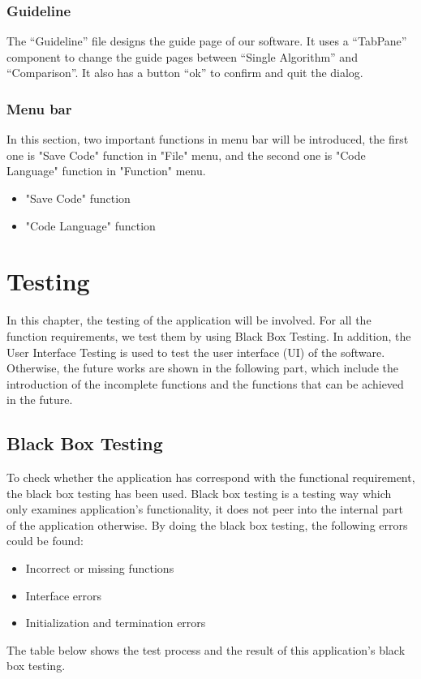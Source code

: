 \documentclass[paper=a4, fontsize=11pt,twoside]{scrartcl}		%
\begin{document}
\subsubsection{Guideline}
The “Guideline” file designs the guide page of our software. It uses a “TabPane” component to change the guide pages between “Single Algorithm” and “Comparison”. It also has a button “ok” to confirm and quit the dialog.
\subsubsection{Menu bar}
In this section, two important functions in menu bar will be introduced, the first one is "Save Code" function in "File" menu, and the second one is "Code Language" function in "Function" menu.
\begin{itemize}
\item "Save Code" function
\item "Code Language" function
\end{itemize}









\section{Testing}
In this chapter, the testing of the application will be involved. For all the function requirements, we test them by using Black Box Testing. In addition, the User Interface Testing is used to test the user interface (UI)  of the software. Otherwise, the future works are shown in the following part, which include the introduction of the incomplete functions and the functions that can be achieved in the future.

\subsection{Black Box Testing}
To check whether the application has correspond with the functional requirement, the black box testing has been used. Black box testing is a testing way which only examines application's functionality, it does not peer into the internal part of the application otherwise. By doing the black box testing, the following errors could be found: \\
\begin{itemize}
\item Incorrect or missing functions
\item Interface errors
\item Initialization and termination errors
\end{itemize}
The table below shows the test process and the result of this application's black box testing.
\end{document}
